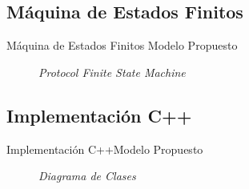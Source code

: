 \subsection{Máquina de Estados Finitos}
\begin{frame}{Máquina de Estados Finitos}	{Modelo Propuesto}
    \begin{figure}				
		\caption{\small \sl Protocol Finite State Machine}
		\label{figure:ProtocolFSM}
    \end{figure}
\end{frame}
\subsection{Implementación C++}
\begin{frame}{Implementación C++}{Modelo Propuesto}
    \begin{figure}				
		\caption{\small \sl Diagrama de Clases}
		\label{figure:DiagramaClases}
    \end{figure}
\end{frame}
